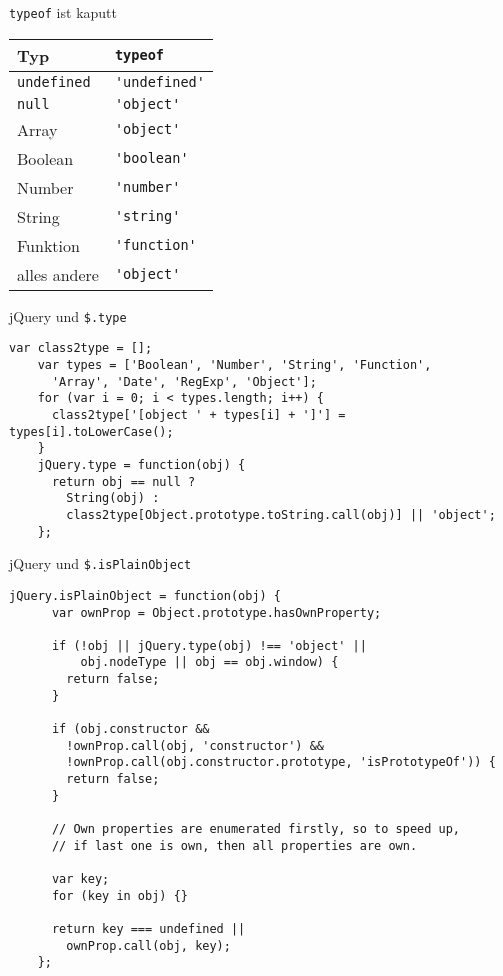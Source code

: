 \begin{frame}[fragile]{\texttt{typeof} ist kaputt}
  \begin{tabular}{ll}
    Typ & \lstinline-typeof- \\ \hline
    \lstinline-undefined- & \lstinline-'undefined'- \\
    \lstinline-null- & \lstinline-'object'- \\
    Array & \lstinline-'object'- \\
    Boolean & \lstinline-'boolean'- \\
    Number & \lstinline-'number'- \\
    String & \lstinline-'string'- \\
    Funktion & \lstinline-'function'- \\
    alles andere & \lstinline-'object'-
  \end{tabular}
\end{frame}

\begin{frame}[fragile]{jQuery und \texttt{\$.type}}
  \begin{lstlisting}[gobble=4]
    var class2type = [];
    var types = ['Boolean', 'Number', 'String', 'Function',
      'Array', 'Date', 'RegExp', 'Object'];
    for (var i = 0; i < types.length; i++) {
      class2type['[object ' + types[i] + ']'] = types[i].toLowerCase();
    }
    jQuery.type = function(obj) {
      return obj == null ?
        String(obj) :
        class2type[Object.prototype.toString.call(obj)] || 'object';
    };
  \end{lstlisting}
\end{frame}

\begin{frame}[fragile]{jQuery und \texttt{\$.isPlainObject}}
  \begin{lstlisting}[gobble=4]
    jQuery.isPlainObject = function(obj) {
      var ownProp = Object.prototype.hasOwnProperty;
    
      if (!obj || jQuery.type(obj) !== 'object' ||
          obj.nodeType || obj == obj.window) {
        return false;
      }
    
      if (obj.constructor &&
        !ownProp.call(obj, 'constructor') &&
        !ownProp.call(obj.constructor.prototype, 'isPrototypeOf')) {
        return false;
      }
    
      // Own properties are enumerated firstly, so to speed up,
      // if last one is own, then all properties are own.
    
      var key;
      for (key in obj) {}
    
      return key === undefined ||
        ownProp.call(obj, key);
    };
  \end{lstlisting}
\end{frame}

